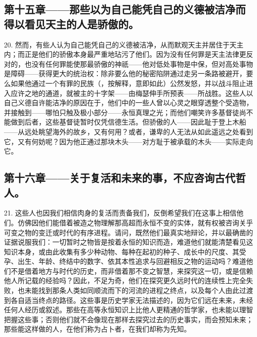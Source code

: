 
\subsection{第十五章——那些以为自己能凭自己的义德被洁净而得以看见天主的人是骄傲的。}

20. 然而，有些人认为自己能凭自己的义德被洁净，从而默观天主并居住于天主内；而正是他们的骄傲本身最严重地玷污了他们。因为没有任何罪是天主法律更反对的，也没有任何罪能使那最骄傲的神祇——他对低处事物是中保，但对高处事物是障碍——获得更大的统治权：除非要么他的秘密陷阱通过走另一条路被避开，要么如果他通过一个有罪的民族（，按解释，意即如此）公然发怒，并以战斗阻止进入应许之地的通道，就被主的十字架——由梅瑟伸手所预表——所战胜。这些人以自己义德自许能洁净的原因在于，他们中的一些人曾以心灵之眼穿透整个受造物，并接触到——哪怕只触及极小部分——永恒真理之光；而他们嘲笑许多基督徒尚不能做到后者，这些基督徒暂时仅凭信德生活。但骄傲的人——因此耻于登上木船——从远处眺望海外的故乡，又有何用？或者，谦卑的人无法从如此遥远之处看到它，又有何妨呢？因为他正通过那块木头——对方耻于被承载的木头——实际走向它。\par


\subsection{第十六章——关于复活和未来的事，不应咨询古代哲人。}

21. 这些人也因我们相信肉身的复活而责备我们，反倒希望我们在这事上相信他们。仿佛因他们能借着被造之物理解那高超而永恒不变的实体，就有权被咨询关乎可变之物的变迁或时代的有序进程。请问，既然他们最真实地辩论，并以最确凿的证据说服我们：一切暂时之物皆是按着永恒的知识而造，难道他们就能清楚看见这知识本身，或由此收集有多少种动物、每种在起初的种子、成长中的尺度、其受孕、出生、年龄、终结中的数字、依其本性追求与回避相反之物的运动吗？难道他们不是借着地方与时代的历史，而非借着那不变之智慧，来探究这一切，或是信赖他人所记载的经验吗？因此，不足为奇，他们在探究更久远时代的连续性上完全失败，也未能找到那条人类如同顺流而下的河流的进程之终点，以及每个人由此过渡到各自适当终点的路径。这些事是历史学家无法描述的，因为它们远在未来，未经任何人经历或叙述。那些在高等永恒知识上比他人更精通的哲学家，也未能以理智把握这些事；否则他们就不会像现在那样去探究过去的历史事实，而会预知未来；那些能这样做的人，在他们称为占卜者，在我们却称为先知。\par

